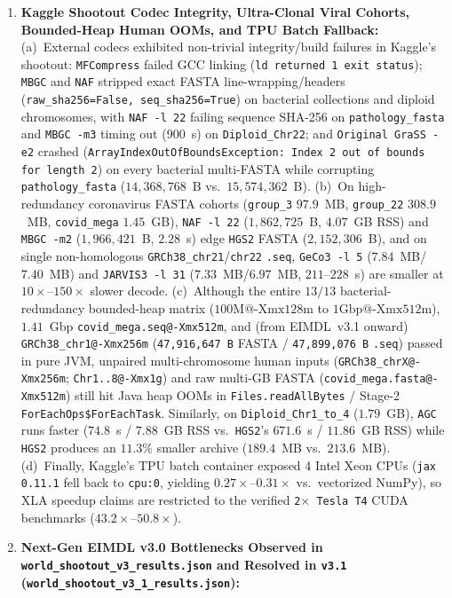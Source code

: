 \documentclass[10pt]{article}
\theoremstyle{definition}
\begin{document}
\begin{enumerate}
  \item \textbf{Kaggle Shootout Codec Integrity, Ultra-Clonal Viral Cohorts, Bounded-Heap Human OOMs, and TPU Batch Fallback:}
  (a)~External codecs exhibited non-trivial integrity/build failures in Kaggle's shootout: \texttt{MFCompress} failed GCC linking (\texttt{ld returned 1 exit status}); \texttt{MBGC} and \texttt{NAF} stripped exact FASTA line-wrapping/headers (\texttt{raw\_sha256=False, seq\_sha256=True}) on bacterial collections and diploid chromosomes, with \texttt{NAF -l 22} failing sequence SHA-256 on \texttt{pathology\_fasta} and \texttt{MBGC -m3} timing out ($900$~s) on \texttt{Diploid\_Chr22}; and \texttt{Original GraSS -e2} crashed (\texttt{ArrayIndexOutOfBoundsException: Index 2 out of bounds for length 2}) on every bacterial multi-FASTA while corrupting \texttt{pathology\_fasta} ($14,368,768$~B vs.\ $15,574,362$~B).
  (b)~On high-redundancy coronavirus FASTA cohorts (\texttt{group\_3} $97.9$~MB, \texttt{group\_22} $308.9$~MB, \texttt{covid\_mega} $1.45$~GB), \texttt{NAF -l 22} ($1,862,725$~B, $4.07$~GB RSS) and \texttt{MBGC -m2} ($1,966,421$~B, $2.28$~s) edge \texttt{HGS2} FASTA ($2,152,306$~B), and on single non-homologous \texttt{GRCh38\_chr21}/\texttt{chr22} \texttt{.seq}, \texttt{GeCo3 -l 5} ($7.84$~MB/$7.40$~MB) and \texttt{JARVIS3 -l 31} ($7.33$~MB/$6.97$~MB, $211\text{--}228$~s) are smaller at $10\times\text{--}150\times$ slower decode.
  (c)~Although the entire $13/13$ bacterial-redundancy bounded-heap matrix ($100\text{M@-Xmx128m}$ to $1\text{Gbp@-Xmx512m}$), $1.41$~Gbp \texttt{covid\_mega.seq@-Xmx512m}, and (from EIMDL~v3.1 onward) \texttt{GRCh38\_chr1@-Xmx256m} (\texttt{47,916,647~B} FASTA / \texttt{47,899,076~B} \texttt{.seq}) passed in pure JVM, unpaired multi-chromosome human inputs (\texttt{GRCh38\_chrX@-Xmx256m}; \texttt{Chr1..8@-Xmx1g}) and raw multi-GB FASTA (\texttt{covid\_mega.fasta@-Xmx512m}) still hit Java heap OOMs in \texttt{Files.readAllBytes} / Stage-2 \texttt{ForEachOps\$ForEachTask}. Similarly, on \texttt{Diploid\_Chr1\_to\_4} ($1.79$~GB), \texttt{AGC} runs faster ($74.8$~s / $7.88$~GB RSS vs.\ \texttt{HGS2}'s $671.6$~s / $11.86$~GB RSS) while \texttt{HGS2} produces an $11.3\%$ smaller archive ($189.4$~MB vs.\ $213.6$~MB).
  (d)~Finally, Kaggle's TPU batch container exposed 4 Intel Xeon CPUs (\texttt{jax 0.11.1} fell back to \texttt{cpu:0}, yielding $0.27\times\text{--}0.31\times$ vs.\ vectorized NumPy), so XLA speedup claims are restricted to the verified \texttt{2$\times$ Tesla T4} CUDA benchmarks ($43.2\times\text{--}50.8\times$).
  \item \textbf{Next-Gen EIMDL v3.0 Bottlenecks Observed in \texttt{world\_shootout\_v3\_results.json} and Resolved in \texttt{v3.1} (\texttt{world\_shootout\_v3\_1\_results.json}):}

\end{enumerate}
\end{document}

